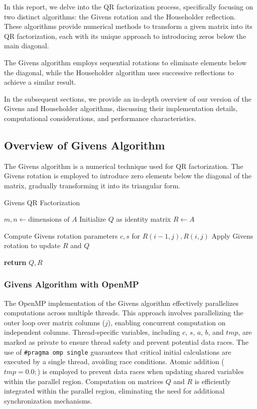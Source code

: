 \documentclass{article}
\begin{document}
In this report, we delve into the QR factorization process, specifically focusing on two distinct algorithms: the Givens rotation and the Householder reflection. These algorithms provide numerical methods to transform a given matrix into its QR factorization, each with its unique approach to introducing zeros below the main diagonal.

The Givens algorithm employs sequential rotations to eliminate elements below the diagonal, while the Householder algorithm uses successive reflections to achieve a similar result.

In the subsequent sections, we provide an in-depth overview of our version of the Givens and Householder algorithms, discussing their implementation details, computational considerations, and performance characteristics.


\subsection{Overview of Givens Algorithm}

The Givens algorithm is a numerical technique used for QR factorization. The Givens rotation is employed to introduce zero elements below the diagonal of the matrix, gradually transforming it into its triangular form.
\begin{algorithm}
\caption{Givens QR Factorization}
\begin{algorithmic}[1]
    \State $m, n \gets \text{dimensions of } A$
    \State Initialize $Q$ as identity matrix
    \State $R \gets A$
    
            \State Compute Givens rotation parameters $c, s$ for $R(i-1, j), R(i, j)$
            \State Apply Givens rotation to update $R$ and $Q$
        \EndFor
    \EndFor
    
    \State \textbf{return} $Q, R$
\EndProcedure
\end{algorithmic}
\end{algorithm}

\subsubsection{Givens Algorithm with OpenMP}

The OpenMP implementation of the Givens algorithm effectively parallelizes computations across multiple threads. This approach involves parallelizing the outer loop over matrix columns (\(j\)), enabling concurrent computation on independent columns. Thread-specific variables, including \(c\), \(s\), \(a\), \(b\), and \(tmp\), are marked as private to ensure thread safety and prevent potential data races. The use of \texttt{\#pragma omp single} guarantees that critical initial calculations are executed by a single thread, avoiding race conditions. Atomic addition (\(tmp = 0.0;\)) is employed to prevent data races when updating shared variables within the parallel region. Computation on matrices \(Q\) and \(R\) is efficiently integrated within the parallel region, eliminating the need for additional synchronization mechanisms.
\end{document}
